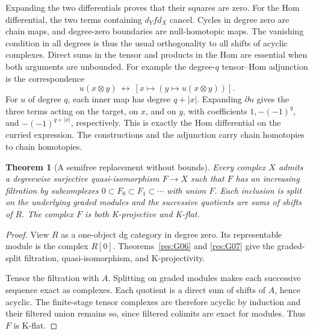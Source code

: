 \documentclass[11pt,oneside,openany]{book}
\newtheorem{theorem}{Theorem}[chapter]
\theoremstyle{definition}
\theoremstyle{remark}
\begin{document}
Expanding the two differentials proves that their squares are zero.
For the Hom differential, the two terms containing \(d_Y f d_X\)
cancel. Cycles in degree zero are chain maps, and degree-zero
boundaries are null-homotopic maps. The vanishing condition in all
degrees is thus the usual orthogonality to all shifts of acyclic
complexes. Direct sums in the tensor and products in the Hom are
essential when both arguments are unbounded. For example the
degree-\(q\) tensor--Hom adjunction is the correspondence
\[
 u(x\otimes y)\ \longleftrightarrow\ [x\longmapsto(y\longmapsto
 u(x\otimes y))].
\]
For \(u\) of degree \(q\), each inner map has degree \(q+|x|\).
Expanding \(\partial u\) gives the three terms acting on the target,
on \(x\), and on \(y\), with coefficients \(1,-(-1)^q\),
and \(-(-1)^{q+|x|}\), respectively. This is exactly the Hom
differential on the curried expression. The constructions and the
adjunction carry chain homotopies to chain homotopies.

\begin{theorem}[A semifree replacement without bounds]\label{res:U02}
Every complex \(X\) admits a degreewise surjective quasi-isomorphism
\(F\to X\) such that
\(F\) has an increasing filtration by subcomplexes
\(0\subset F_0\subset F_1\subset\cdots\) with union \(F\).
Each inclusion is split on the underlying graded modules and the
successive quotients are sums of shifts of \(R\).
The complex \(F\) is both K-projective and K-flat.
\end{theorem}
\begin{proof}
View \(R\) as a one-object dg category in degree zero.
Its representable module is the complex \(R[0]\).
Theorems~\ref{res:G06} and \ref{res:G07} give the
graded-split filtration, quasi-isomorphism, and K-projectivity.

Tensor the filtration with \(A\). Splitting on graded modules makes
each successive sequence exact as complexes. Each quotient is a
direct sum of shifts of \(A\), hence acyclic. The finite-stage tensor
complexes are therefore acyclic by induction and their filtered
union remains so, since filtered colimits are exact for modules.
Thus \(F\) is K-flat.
\end{proof}
\end{document}

